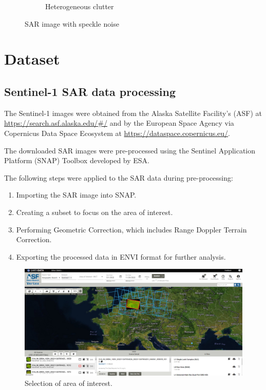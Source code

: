 \begin{figure}[H]
\begin{subfigure}[b]{0.45\textwidth}
    \caption{Heterogeneous clutter }
    \label{fig:s2}
  \end{subfigure}
  \caption{SAR image with speckle noise}
  \label{fig:speckle}
\end{figure}

\section{Dataset}
\subsection{Sentinel-1 SAR data processing}
The Sentinel-1 images were obtained from the Alaska Satellite Facility's (ASF) at \url{https://search.asf.alaska.edu/#/} and by the European Space Agency via Copernicus Data Space Ecosystem at \url{https://dataspace.copernicus.eu/}.

The downloaded SAR images were pre-processed using the Sentinel Application Platform (SNAP) Toolbox developed by ESA. 

The following steps were applied to the SAR data during pre-processing:

\begin{enumerate}
    \item Importing the SAR image into SNAP.
    \item Creating a subset to focus on the area of interest.
    \item Performing Geometric Correction, which includes Range Doppler Terrain Correction.
    \item Exporting the processed data in ENVI format for further analysis.
\end{enumerate}



\begin{figure}[H]
    \centering
    \includegraphics[width=1\textwidth]{../../Images/PNG/alaska1.png}
    \caption[Selection of area of interest]{Selection of area of interest.}
    \label{fig:alaska-area}
\end{figure}

